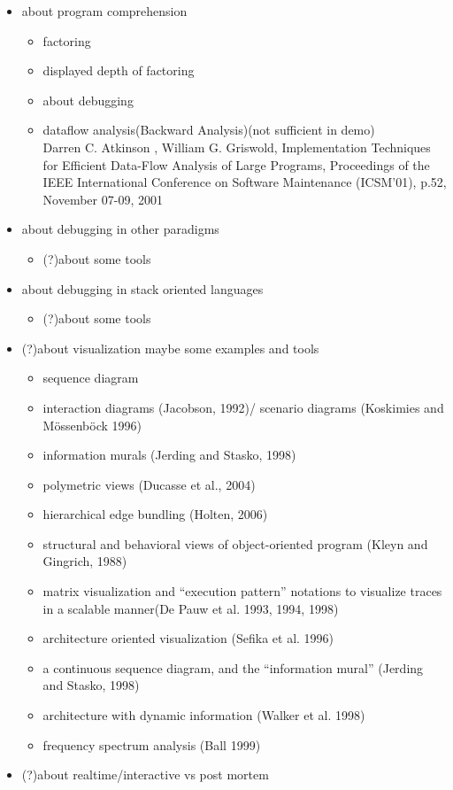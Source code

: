\begin{itemize}
\item about program comprehension
	\begin{itemize} \item factoring \item displayed depth of factoring \end{itemize}
	\begin{itemize} \item about debugging \end{itemize}
	\begin{itemize}
	\item dataflow analysis(Backward Analysis)(not sufficient in demo) \\
		Darren C. Atkinson , William G. Griswold, Implementation Techniques for Efficient Data-Flow Analysis of Large Programs, Proceedings of the IEEE International Conference on Software Maintenance (ICSM'01), p.52, November 07-09, 2001
	\end{itemize}
\item about debugging in other paradigms
	\begin{itemize} \item (?)about some tools \end{itemize}
\item about debugging in stack oriented languages
	\begin{itemize} \item (?)about some tools \end{itemize}
\item (?)about visualization maybe some examples and tools
	\begin{itemize}
	\item sequence diagram
	\item interaction diagrams (Jacobson, 1992)/ scenario diagrams (Koskimies and Mössenböck 1996)
	\item information murals (Jerding and Stasko, 1998)
	\item polymetric views (Ducasse et al., 2004)
	\item hierarchical edge bundling (Holten, 2006)
	\item structural and behavioral views of object-oriented program (Kleyn and Gingrich, 1988)
	\item matrix visualization and “execution pattern” notations \cite{Pauw98executionpatterns} to visualize traces in a scalable manner(De Pauw et al. 1993, 1994, 1998) 
	\item architecture oriented visualization (Sefika et al. 1996)
	\item a continuous sequence diagram, and the “information mural” (Jerding and Stasko, 1998)
	\item architecture with dynamic information (Walker et al. 1998)
	\item frequency spectrum analysis (Ball 1999)
	\end{itemize}
\item (?)about realtime/interactive vs post mortem
\end{itemize}


